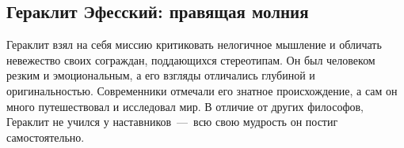 \subsection{Гераклит Эфесский: правящая молния}

Гераклит взял на себя миссию критиковать нелогичное мышление и обличать невежество своих сограждан, поддающихся стереотипам. Он был человеком резким и эмоциональным, а его взгляды отличались глубиной и оригинальностью. Современники отмечали его знатное происхождение, а сам он много путешествовал и исследовал мир. В отличие от других философов, Гераклит не учился у наставников~---~всю свою мудрость он постиг самостоятельно.





